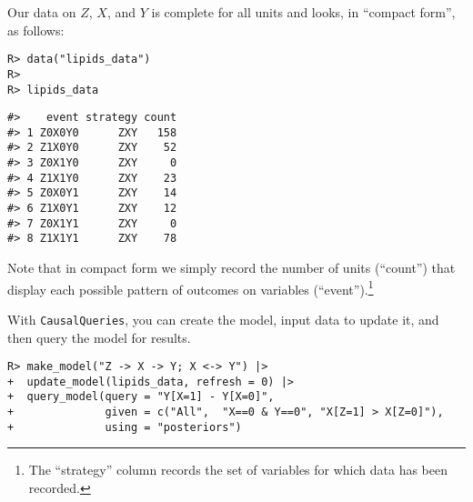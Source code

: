 \documentclass[
  11pt,
  article]{jss}
\begin{document}
Our data on \(Z\), \(X\), and \(Y\) is complete for all units and looks,
in ``compact form'', as follows:

\begin{verbatim}
R> data("lipids_data")
R> 
R> lipids_data
\end{verbatim}

\begin{verbatim}
#>    event strategy count
#> 1 Z0X0Y0      ZXY   158
#> 2 Z1X0Y0      ZXY    52
#> 3 Z0X1Y0      ZXY     0
#> 4 Z1X1Y0      ZXY    23
#> 5 Z0X0Y1      ZXY    14
#> 6 Z1X0Y1      ZXY    12
#> 7 Z0X1Y1      ZXY     0
#> 8 Z1X1Y1      ZXY    78
\end{verbatim}

Note that in compact form we simply record the number of units
(``count'') that display each possible pattern of outcomes on variables
(``event'').\footnote{The ``strategy'' column records the set of
  variables for which data has been recorded.}

With \texttt{CausalQueries}, you can create the model, input data to
update it, and then query the model for results.

\begin{verbatim}
R> make_model("Z -> X -> Y; X <-> Y") |>
+  update_model(lipids_data, refresh = 0) |>
+  query_model(query = "Y[X=1] - Y[X=0]",
+              given = c("All",  "X==0 & Y==0", "X[Z=1] > X[Z=0]"),
+              using = "posteriors") 
\end{verbatim}

\hypertarget{tbl-lipids}{}
\begin{table}
\caption{\label{tbl-lipids}Replication of \citet{chickering1996clinician}. }\tabularnewline

\centering
{}
\end{table}
\end{document}
